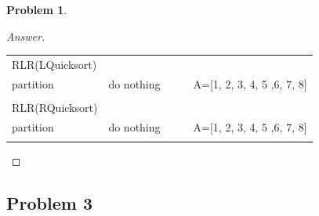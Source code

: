 \documentclass[11pt]{article}
\theoremstyle{definition}
\theoremstyle{definition}
\newtheorem{required}{Problem}
\theoremstyle{definition}
\begin{document}
\begin{required}
\begin{proof}[Answer]
\begin{tabular}{lll | ll}
RLR(LQuicksort) \\ partition & do nothing &  &    &  A=[1, 2, 3, 4, 5 ,6, 7, 8]  \\
\\
RLR(RQuicksort) \\ partition & do nothing &  &    &  A=[1, 2, 3, 4, 5 ,6, 7, 8]  \\
\\


\end{tabular}

\end{proof}

\end{required}

\newpage
\subsection{Problem 3}
\end{document}

